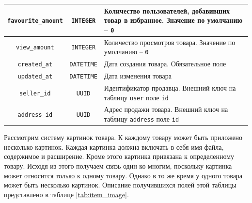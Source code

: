 \documentclass[a4paper,14pt]{extarticle}
\begin{document}
\begin{center}
\begin{longtable}{|c|c|>{\centering\arraybackslash}m{7.5cm}|}
        \hline
        \texttt{favourite\_amount}   & \texttt{INTEGER}       & Количество пользователей, добавивших товар в избранное. Значение по умолчанию -- \texttt{0}                                                                                           \\
        \hline
        \texttt{view\_amount}        & \texttt{INTEGER}       & Количество просмотров товара. Значение по умолчанию -- \texttt{0}                                                                                                                     \\
        \hline
        \texttt{created\_at}         & \texttt{DATETIME}      & Дата создания товара. Обязательное поле                                                                                                                                               \\
        \hline
        \texttt{updated\_at}         & \texttt{DATETIME}      & Дата изменения товара                                                                                                                                                                 \\
        \hline
        \texttt{seller\_id}          & \texttt{UUID}          & Идентификатор продавца. Внешний ключ на таблицу \texttt{user} поле \texttt{id}                                                                                                        \\
        \hline
        \texttt{address\_id}         & \texttt{UUID}          & Адрес продажи товара. Внешний ключ на таблицу \texttt{address} поле \texttt{id}                                                                                                       \\
        \hline
    \end{longtable}
\end{center}

Рассмотрим систему картинок товара. К каждому товару может быть приложено несколько картинок. Каждая картинка должна включать в себя имя файла, содержимое и расширение. Кроме этого картинка привязана к определенному товару. Исходя из этого получаем связь один ко многим, поскольку картинка может относится только к одному товару. Однако в то же время у одного товара может быть несколько картинок. Описание получившихся полей этой таблицы представлено в таблице \ref{tab:item_image}.
\end{document}
